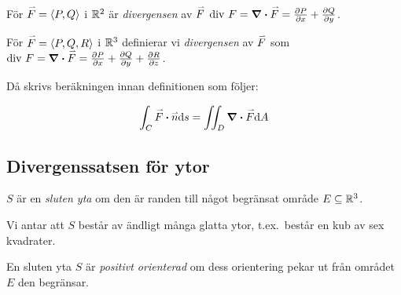 \documentclass[a4paper]{article}
\begin{document}
\begin{defn}
    För \(
        \accentset{\rightharpoonup}{F} = \left\langle P,Q\right\rangle 
    \) i \(
        \mathbb{R}^2
    \) är \emph{divergensen} av \(
        \accentset{\rightharpoonup}{F}
    \) \(
        \text{div } F = \div{\accentset{\rightharpoonup}{F}} = \pdv{P}{x}+\pdv{Q}{y}
    \).

    För \(
        \accentset{\rightharpoonup}{F} = \left\langle P,Q,R\right\rangle 
    \) i \(
        \mathbb{R}^3
    \) definierar vi \emph{divergensen} av \(
        \accentset{\rightharpoonup}{F}
    \) som \(
        \text{div } F = \div{\accentset{\rightharpoonup}{F}} = \pdv{P}{x}+\pdv{Q}{y} + \pdv{R}{z}
    \).
\end{defn}

Då skrivs beräkningen innan definitionen som följer:

\begin{sats}
    \[
        \int_C \vef \sprod \ven \dd s = \iint_D \div{\vef} \dd A
    \] 
\end{sats}

\subsection{Divergenssatsen för ytor}
\begin{defn}
    \(
        S
    \) är en \emph{sluten yta} om den är randen till något begränsat område \(
        E \subseteq \mathbb{R}^3
    \).
\end{defn}

Vi antar att \(
    S
\) består av ändligt många glatta ytor, t.ex.\ består en kub av sex kvadrater.

\begin{defn}
    En sluten yta \(
        S
    \) är \emph{positivt orienterad} om dess orientering pekar ut från området \(
        E
    \) den begränsar.
\end{defn}
\end{document}
